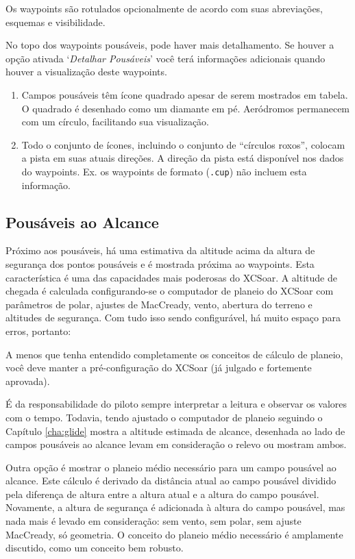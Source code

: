 Os waypoints são rotulados opcionalmente de acordo com suas abreviações, esquemas e visibilidade.

No topo dos waypoints pousáveis, pode haver mais detalhamento.  Se houver a opção ativada 
`{\it Detalhar Pousáveis}' você terá informações adicionais quando houver a visualização deste waypoints.

\begin{enumerate}
\item  Campos pousáveis têm ícone quadrado apesar de serem mostrados em tabela.  O quadrado é desenhado como um diamante em pé.  Aeródromos permanecem com um círculo, facilitando sua visualização. 
\item  Todo o conjunto de ícones, incluindo o conjunto de “círculos roxos”, colocam a pista em suas atuais direções.  A direção da pista está disponível nos dados do waypoints.  Ex. os waypoints de formato (\verb|.cup|) não incluem esta informação.
\end{enumerate}

\subsection*{Pousáveis ao Alcance}
Próximo aos pousáveis, há uma estimativa da altitude acima da altura de segurança dos pontos pousáveis e é mostrada próxima ao waypoints.  Esta característica é uma das capacidades mais poderosas do XCSoar.  A altitude de chegada é calculada configurando-se o computador de planeio do XCSoar com parâmetros de polar, ajustes de MacCready, vento, abertura do terreno e altitudes de segurança.  Com tudo isso sendo configurável, há muito espaço para erros, portanto:

A menos que tenha entendido completamente os conceitos de cálculo de planeio, você deve \warning manter a pré-configuração do XCSoar (já julgado e fortemente aprovada).

É da responsabilidade do piloto sempre interpretar a leitura e observar os valores com o tempo.  Todavia, tendo ajustado o computador de planeio seguindo o Capítulo 
\ref{cha:glide} mostra a altitude estimada de alcance, desenhada ao lado de campos pousáveis ao alcance levam em consideração o relevo ou mostram ambos.

Outra opção é mostrar o planeio médio necessário para um campo pousável ao alcance.  Este cálculo é derivado da distância atual ao campo pousável dividido pela diferença de altura entre a altura atual e a altura do campo pousável.  Novamente, a altura de segurança é adicionada à altura do campo pousável, mas nada mais é levado em consideração: sem vento, sem polar, sem ajuste MacCready, só geometria.  O conceito do planeio médio necessário é amplamente discutido, como um conceito bem robusto.

